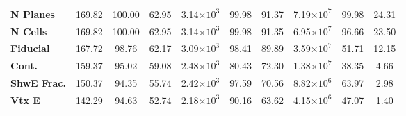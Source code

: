 \begin{table}[!hb]
\begin{tabular}{|l|ccc|ccc|ccc|}
\textbf{N Planes}       & 169.82            & 100.00                                                             & 62.95                                     & 3.14$\times 10^3$           & 99.98                                                               & 91.37                                      & 7.19$\times 10^7$          & 99.98                                                              & 24.31                                     \\
\textbf{N Cells}        & 169.82            & 100.00                                                             & 62.95                                     & 3.14$\times 10^3$           & 99.98                                                               & 91.35                                      & 6.95$\times 10^7$ & 96.66                                                              & 23.50                                     \\
\textbf{Fiducial}     & 167.72            & 98.76                                                              & 62.17                                     & 3.09$\times 10^3$           & 98.41                                                               & 89.89                                      & 3.59$\times 10^7$          & 51.71                                                              & 12.15                                     \\
\textbf{Cont.}  & 159.37            & 95.02                                                              & 59.08                                     & 2.48$\times 10^3$           & 80.43                                                               & 72.30                                      & 1.38$\times 10^7$          & 38.35                                                              & 4.66                                      \\
\textbf{ShwE Frac.}  & 150.37            & 94.35                                                              & 55.74                                     & 2.42$\times 10^3$           & 97.59                                                               & 70.56                                      & 8.82$\times 10^6$          & 63.97                                                              & 2.98                                      \\
\textbf{Vtx E}         & 142.29            & 94.63                                                              & 52.74                                     & 2.18$\times 10^3$           & 90.16                                                               & 63.62                                      & 4.15$\times 10^6$          & 47.07                                                              & 1.40                                      \\

\end{tabular}
\end{table}
